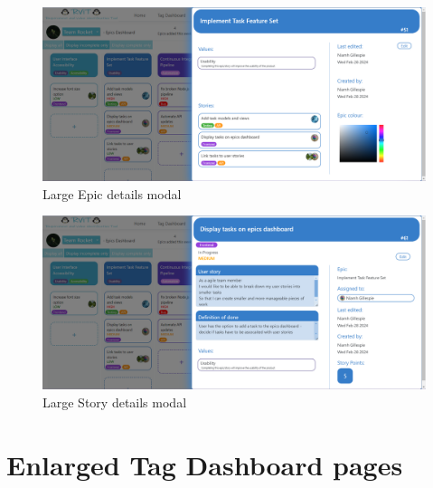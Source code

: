 \documentclass{l4proj}
\begin{document}
\begin{appendices}
\begin{figure}[h!]
\centering
\includegraphics[scale=0.4]{dissertation/images/EpicDetails.png}
\caption{Large Epic details modal}
\label{fig: large epic detail modals}
\end{figure}
\hfill
\begin{figure}[h!]
\centering
\includegraphics[scale=0.4]{dissertation/images/StoryDetails.png}
\caption{Large Story details modal}
\label{fig:large story detail modals}
\end{figure}

\chapter{Enlarged Tag Dashboard pages}
\label{app: large tag and value views}


\end{appendices}
\end{document}
